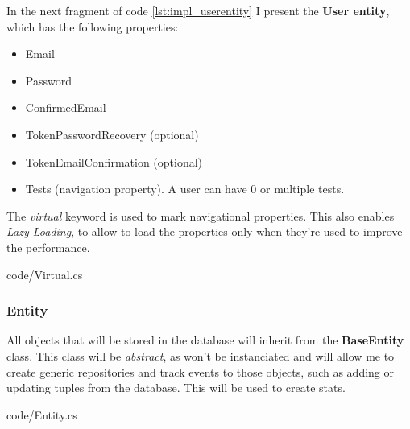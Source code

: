             In the next fragment of code \ref{lst:impl_userentity} I present the \textbf{User entity}, which has the following properties:
            \begin{itemize}[noitemsep]
                \item Email
                \item Password
                \item ConfirmedEmail
                \item TokenPasswordRecovery (optional)
                \item TokenEmailConfirmation (optional)
                \item Tests (navigation property). A user can have 0 or multiple tests.
            \end{itemize}
            The \textit{virtual} keyword is used to mark navigational properties. This also enables \textit{Lazy Loading}, to allow to load the properties only when they're used to improve the performance.
            
            {code/Virtual.cs}

        \subsubsection{Entity}
            All objects that will be stored in the database will inherit from the \textbf{BaseEntity} class. 
            This class will be \textit{abstract}, as won't be instanciated and will allow me to create generic repositories and 
            track events to those objects, such as adding or updating tuples from the database. This will be used to create stats.
            
            {code/Entity.cs}

